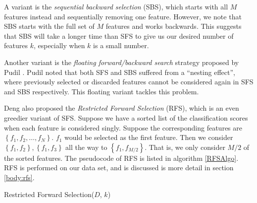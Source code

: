 \documentclass[12pt, twoside, a4paper]{article}
\begin{document}
A variant is the \textit{sequential backward selection} (SBS), which starts with all $M$ features instead and sequentially removing one feature. However, we note that SBS starts with the full set of $M$ features and works backwards. This suggests that SBS will take a longer time than SFS to give us our desired number of features $k$, especially when $k$ is a small number.

Another variant is the \textit{floating forward/backward search} strategy proposed by Pudil \cite{RefWorks:178}. Pudil noted that both SFS and SBS suffered from a ``nesting effect'', where previously selected or discarded features cannot be considered again in SFS and SBS respectively. This floating variant tackles this problem.

Deng \cite{deng1998omega} also proposed the \textit{Restricted Forward Selection} (RFS), which is an even greedier variant of SFS. Suppose we have a sorted list of the classification scores when each feature is considered singly. Suppose the corresponding features are $\left\lbrace f_1, f_2, \dots , f_N \right\rbrace$. $f_1$ would be selected as the first feature. Then we consider $\left\lbrace f_1, f_2 \right\rbrace, \left\lbrace f_1, f_3 \right\rbrace$ all the way to $\left\lbrace f_1, f_{M/2} \right\rbrace$. That is, we only consider $M/2$ of the sorted features. The pseudocode of RFS is listed in algorithm \ref{RFSAlgo}. RFS is performed on our data set, and is discussed is more detail in section \ref{body:rfs}.


\begin{algorithm}
\DontPrintSemicolon
{}
\BlankLine
{}
\caption{Restricted Forward Selection($D$, $k$) \label{RFSAlgo}}
\end{algorithm}
\end{document}
